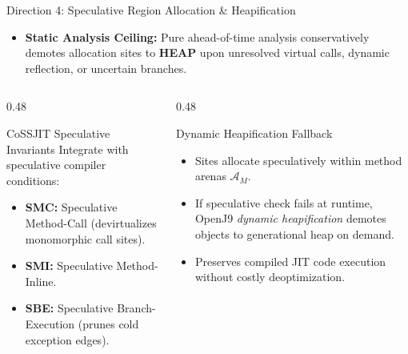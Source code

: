 \documentclass[11pt]{beamer}
\providecommand{\HEAP}{\textbf{HEAP}}
\begin{document}
\begin{frame}{Direction 4: Speculative Region Allocation \& Heapification}
  \begin{itemize}
    \item \textbf{Static Analysis Ceiling:} Pure ahead-of-time analysis conservatively demotes allocation sites to \HEAP{} upon unresolved virtual calls, dynamic reflection, or uncertain branches.
  \end{itemize}

  \begin{columns}[T]
    \begin{column}{0.48\textwidth}
      \begin{block}{CoSSJIT Speculative Invariants}
        \small
        Integrate with speculative compiler conditions:
        \begin{itemize}\setlength{\itemsep}{2pt}
          \item \textbf{SMC:} Speculative Method-Call (devirtualizes monomorphic call sites).
          \item \textbf{SMI:} Speculative Method-Inline.
          \item \textbf{SBE:} Speculative Branch-Execution (prunes cold exception edges).
        \end{itemize}
      \end{block}
    \end{column}
    \begin{column}{0.48\textwidth}
      \begin{alertblock}{Dynamic Heapification Fallback}
        \small
        \begin{itemize}\setlength{\itemsep}{2pt}
          \item Sites allocate speculatively within method arenas $\mathcal{A}_M$.
          \item If speculative check fails at runtime, OpenJ9 \emph{dynamic heapification} demotes objects to generational heap on demand.
          \item Preserves compiled JIT code execution without costly deoptimization.
        \end{itemize}
      \end{alertblock}
    \end{column}
  \end{columns}
\end{frame}
\end{document}

